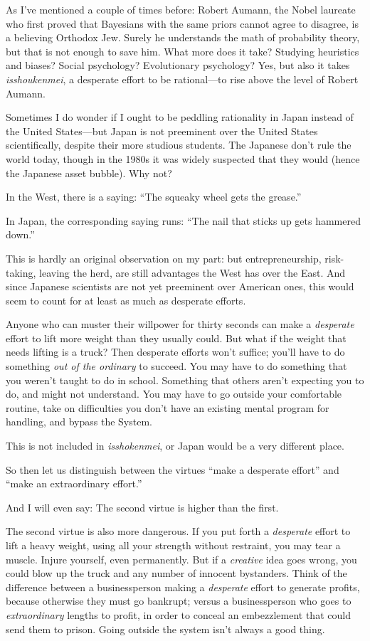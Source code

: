 {
 As I've mentioned a couple of times before: Robert
Aumann, the Nobel laureate who first proved that Bayesians with the
same priors cannot agree to disagree, is a believing Orthodox Jew.
Surely he understands the math of probability theory, but that is not
enough to save him. What more does it take? Studying heuristics and
biases? Social psychology? Evolutionary psychology? Yes, but also it
takes \textit{isshoukenmei}, a desperate effort to be rational---to
rise above the level of Robert Aumann.}

{
 Sometimes I do wonder if I ought to be peddling rationality in
Japan instead of the United States---but Japan is not preeminent over
the United States scientifically, despite their more studious students.
The Japanese don't rule the world today, though in the
1980s it was widely suspected that they would (hence the Japanese asset
bubble). Why not?}

{
 In the West, there is a saying: ``The squeaky
wheel gets the grease.''}

{
 In Japan, the corresponding saying runs: ``The
nail that sticks up gets hammered down.''}

{
 This is hardly an original observation on my part: but
entrepreneurship, risk-taking, leaving the herd, are still advantages
the West has over the East. And since Japanese scientists are not yet
preeminent over American ones, this would seem to count for at least as
much as desperate efforts.}

{
 Anyone who can muster their willpower for thirty seconds can make
a \textit{desperate} effort to lift more weight than they usually
could. But what if the weight that needs lifting is a truck? Then
desperate efforts won't suffice; you'll
have to do something \textit{out of the ordinary} to succeed. You may
have to do something that you weren't taught to do in
school. Something that others aren't expecting you to
do, and might not understand. You may have to go outside your
comfortable routine, take on difficulties you don't
have an existing mental program for handling, and bypass the System.}

{
 This is not included in \textit{isshokenmei}, or Japan would be a
very different place.}

{
 So then let us distinguish between the virtues
``make a desperate effort'' and
``make an extraordinary effort.''}

{
 And I will even say: The second virtue is higher than the first.}

{
 The second virtue is also more dangerous. If you put forth a
\textit{desperate} effort to lift a heavy weight, using all your
strength without restraint, you may tear a muscle. Injure yourself,
even permanently. But if a \textit{creative} idea goes wrong, you could
blow up the truck and any number of innocent bystanders. Think of the
difference between a businessperson making a \textit{desperate} effort
to generate profits, because otherwise they must go bankrupt; versus a
businessperson who goes to \textit{extraordinary} lengths to profit, in
order to conceal an embezzlement that could send them to prison. Going
outside the system isn't always a good thing.}

